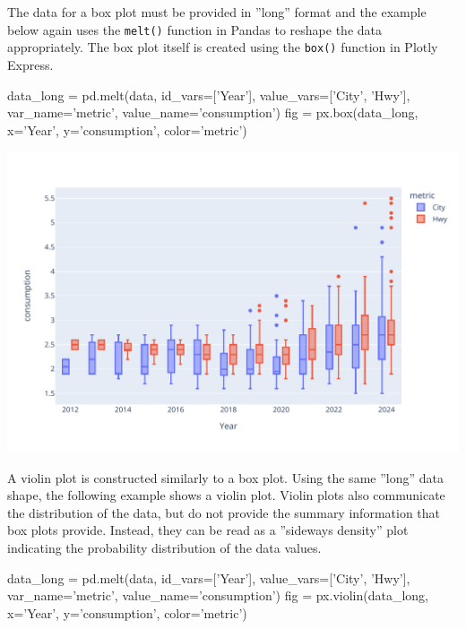 The data for a box plot must be provided in ''long'' format and the example below again uses the \texttt{melt()} function in Pandas to reshape the data appropriately. The box plot itself is created using the \texttt{box()} function in Plotly Express. 

\begin{samepage}
\begin{pythoncode}
data_long = pd.melt(data, 
    id_vars=['Year'], 
    value_vars=['City', 'Hwy'], 
    var_name='metric', 
    value_name='consumption')
fig = px.box(data_long, x='Year', y='consumption', color='metric')
\end{pythoncode}
\end{samepage}

\begin{center}
  \includegraphics[width=.8\textwidth]{px.fuel.box.pdf}
\end{center}

A violin plot is constructed similarly to a box plot. Using the same ''long'' data shape, the following example shows a violin plot. Violin plots also communicate the distribution of the data, but do not provide the summary information that box plots provide. Instead, they can be read as a ''sideways density'' plot indicating the probability distribution of the data values.

\begin{samepage}
\begin{pythoncode}
data_long = pd.melt(data, 
    id_vars=['Year'], 
    value_vars=['City', 'Hwy'], 
    var_name='metric', 
    value_name='consumption')
fig = px.violin(data_long, x='Year', y='consumption', color='metric')
\end{pythoncode}
\end{samepage}

